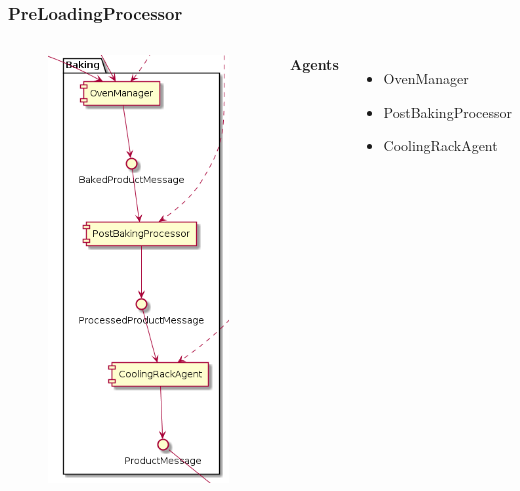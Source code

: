 \documentclass{beamer}
\begin{document}
\begin{frame}
    \frametitle{\huge{PreLoadingProcessor}}
    \begin{columns}[t]
        \begin{figure}[H]
            \centering
            \includegraphics[width=0.6\linewidth]{baking_component_diagram.png}
        \end{figure}
            \textbf{Agents}
            \begin{itemize}
                \item OvenManager
                \item PostBakingProcessor
                \item CoolingRackAgent
            \end{itemize}
    \end{columns}
\end{frame}
\end{document}
